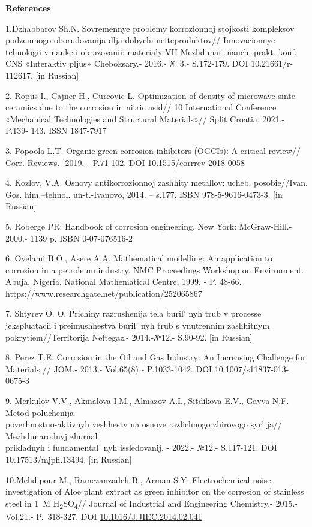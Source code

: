 \begin{center}
{\bfseries References}
\end{center}

\begin{references}
1.Dzhabbarov Sh.N. Sovremennye problemy korrozionnoj stojkosti
kompleksov podzemnogo oborudovanija dlja dobychi nefteproduktov//
Innovacionnye tehnologii v nauke i obrazovanii: materialy VII Mezhdunar.
nauch.-prakt. konf. CNS «Interaktiv pljus» Cheboksary.- 2016.- № 3.-
S.172-179. DOI 10.21661/r-112617. {[}in Russian{]}

2. Ropus I., Cajner H., Curcovic L. Optimization of density of microwave
sinte ceramics due to the corrosion in nitric asid// 10 International
Conference «Mechanical Technologies and Structural Materials»// Split
Croatia, 2021.- P.139- 143. ISSN 1847-7917

3. Popoola L.T. Organic green corrosion inhibitors (OGCIs): A critical
review// Corr. Reviews.- 2019. - P.71-102. DOI 10.1515/corrrev-2018-0058

4. Kozlov, V.A. Osnovy antikorrozionnoj zashhity metallov: ucheb.
posobie//Ivan. Gos. him.--tehnol. un-t.-Ivanovo, 2014. -- s.177. ISBN
978-5-9616-0473-3. {[}in Russian{]}

5. Roberge PR: Handbook of corrosion engineering. New York:
McGraw-Hill.- 2000.- 1139 p. ISBN 0-07-076516-2

6. Oyelami B.O., Asere A.A. Mathematical modelling: An application to
corrosion in a petroleum industry. NMC Proceedings Workshop on
Environment. Abuja, Nigeria. National Mathematical Centre, 1999. - P.
48-66. https://www.researchgate.net/publication/252065867

7. Shtyrev O. O. Prichiny razrushenija tela buril' nyh
trub v processe jekspluatacii i preimushhestva buril' nyh
trub s vnutrennim zashhitnym pokrytiem//Territorija Neftegaz.-
2014.-№12.- S.90-92. {[}in Russian{]}

8. Perez T.E. Corrosion in the Oil and Gas Industry: An Increasing
Challenge for Materials // JOM.- 2013.- Vol.65(8) - P.1033-1042. DOI
10.1007/s11837-013-0675-3

9. Merkulov V.V., Akmalova I.M., Almazov A.I., Sitdikova E.V., Gavva
N.F. Metod poluchenija \\poverhnostno-aktivnyh veshhestv na osnove
razlichnogo zhirovogo syr' ja// Mezhdunarodnyj zhurnal
\\prikladnyh i fundamental' nyh issledovanij. - 2022.-
№12.- S.117-121. DOI 10.17513/mjpfi.13494. {[}in Russian{]}

10.Mehdipour M., Ramezanzadeh B., Arman S.Y. Electrochemical noise
investigation of Aloe plant extract as green inhibitor on the corrosion
of stainless steel in 1~M H\textsubscript{2}SO\textsubscript{4}//
Journal of Industrial and Engineering Chemistry.- 2015.-Vol.21.-
P.~318-327.
DOI \href{https://doi.org/10.1016/J.JIEC.2014.02.041}{10.1016/J.JIEC.2014.02.041}
\end{references}

